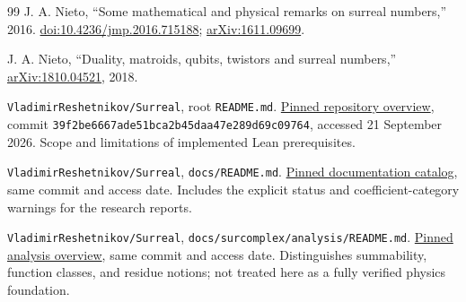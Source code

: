 \documentclass[11pt,letterpaper]{article}
\theoremstyle{definition}
\theoremstyle{remark}
\begin{document}
\begin{thebibliography}{99}
J. A. Nieto, ``Some mathematical and physical remarks on surreal numbers,''
2016.
\href{https://doi.org/10.4236/jmp.2016.715188}{doi:10.4236/jmp.2016.715188};
\href{https://arxiv.org/abs/1611.09699}{arXiv:1611.09699}.

J. A. Nieto, ``Duality, matroids, qubits, twistors and surreal numbers,''
\href{https://arxiv.org/abs/1810.04521}{arXiv:1810.04521}, 2018.

\texttt{VladimirReshetnikov/Surreal}, root \texttt{README.md}.
\href{https://github.com/VladimirReshetnikov/Surreal/blob/39f2be6667ade51bca2b45daa47e289d69c09764/README.md}{Pinned repository overview},
commit \texttt{39f2be6667ade51bca2b45daa47e289d69c09764},
accessed 21 September 2026. Scope and limitations of implemented Lean prerequisites.

\texttt{VladimirReshetnikov/Surreal}, \texttt{docs/README.md}.
\href{https://github.com/VladimirReshetnikov/Surreal/blob/39f2be6667ade51bca2b45daa47e289d69c09764/docs/README.md}{Pinned documentation catalog},
same commit and access date. Includes the explicit status and coefficient-category
warnings for the research reports.

\texttt{VladimirReshetnikov/Surreal},
\texttt{docs/surcomplex/analysis/README.md}.
\href{https://github.com/VladimirReshetnikov/Surreal/blob/39f2be6667ade51bca2b45daa47e289d69c09764/docs/surcomplex/analysis/README.md}{Pinned analysis overview},
same commit and access date. Distinguishes summability, function classes, and
residue notions; not treated here as a fully verified physics foundation.

\end{thebibliography}
\endgroup
\end{document}
